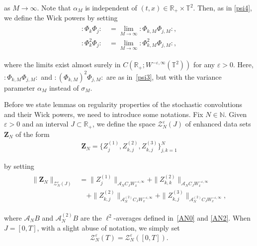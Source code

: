 \documentclass[letterpaper, 11pt,  reqno]{amsart}
\newcommand{\1}{\hspace{0.5mm}\text{I}\hspace{0.2mm}}
\newcommand{\noi}{\noindent}
\newcommand{\R}{\mathbb{R}}
\newcommand{\T}{\mathbb{T}}
\newcommand{\N}{\mathbb{N}}
\newcommand{\al}{\alpha}
\newcommand{\s}{\sigma}
\newcommand{\eps}{\varepsilon}
\newcommand{\A}{\mathcal{A}}
\newcommand{\ZZ}{\mathcal{Z}}
\newcommand{\wick}[1]{:\!{#1}\!:}
\renewcommand{\l}{\ell}
\numberwithin{equation}{section}
\numberwithin{theorem}{section}
\begin{document}
\noi
as $M \to \infty$.
Note that $\al_M$ is independent of 
$(t, x) \in \R_+ \times \T^2$.
Then, as in \eqref{psi4}, we define the Wick powers
by setting
\begin{align}
\begin{split}
    \wick{\Phi_k \Phi_j} \, &=  \lim_{M \to \infty} \wick{\Phi_{k,M} \Phi_{j,M}} , \\
    \wick{\Phi_k^2 \Phi_j} \, &=  \lim_{M \to \infty} \wick{\Phi_{k,M}^2 \Phi_{j,M}}, 
\end{split}
\label{def_wick2}
\end{align}


\noi
where the limits exist almost surely in 
 $C(\R_+; W^{-\eps, \infty}(\T^2))$
for any $\eps > 0$.
Here, 
$\wick{\Phi_{k,M} \Phi_{j,M}}$ and $\wick{(\Phi_{k,M})^2 \Phi_{j,M}}$ 
are  as in~\eqref{psi3}, 
but with the variance parameter $\al_M$ instead of $\s_M$.








Before we state lemmas on regularity properties
of the stochastic convolutions and their Wick powers, we need to introduce 
some notations.
Fix $N \in \N$.
Given
$\eps> 0 $
and an interval $J \subset \R_+$, 
we
define the space $\ZZ_N^\eps(J)$
 of enhanced data sets
$\pmb Z_N$ of the form
\begin{align}
\pmb Z_N = \big\{Z_j^{(1)},  Z_{k, j}^{(2)}, Z_{k, j}^{(3)}\big\}_{j, k = 1}^N
\label{X0}
\end{align}


\noi
by setting
\begin{align}
\begin{split}
\| \pmb Z_N \|_{\ZZ_N^\eps(J)}
&
=  \|Z_j^{(1)}\|_{\A_N C_J W_x^{- \eps, \infty}}
+  \|Z_{k, k}^{(2)}\|_{\A_N C_J W_x^{- \eps, \infty}}\\
&  \quad
+  \|Z_{k, j}^{(2)}\|_{\A^{(2)}_N C_J W_x^{- \eps, \infty}}
 +   \|Z_{k, j}^{(3)}\|_{\A^{(2)}_N C_J W_x^{- \eps, \infty}}, 
\end{split}
\label{X1}
\end{align}



\noi
where 
$\A_N B$ %
and 
$\A^{(2)}_N B$ %
are 
the $\l^2$-averages defined
 in~\eqref{AN0} and \eqref{AN2}.
When $J = [0, T]$, 
with a slight abuse of notation, we simply set
\begin{align}
\ZZ_N^\eps(T) = \ZZ_N^\eps([0, T]).
\label{X1a}
\end{align}
\end{document}
